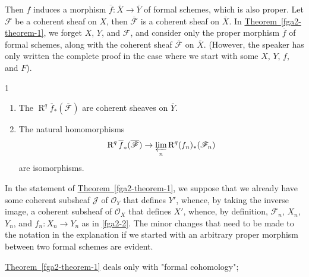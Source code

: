   Then \(f\) induces a morphism \(\overline {f}\colon \overline {X}\to \overline {Y}\) of formal schemes, which is also proper.
  Let \(\mathscr {F}\) be a coherent sheaf on \(X\), then \(\overline {\mathscr {F}}\) is a coherent sheaf on \(\overline {X}\).
  In \hyperref[fga2-theorem-1]{Theorem~\ref*{fga2-theorem-1}}, we forget \(X\), \(Y\), and \(\mathscr {F}\), and consider only the proper morphism \(\overline {f}\) of formal schemes, along with the coherent sheaf \(\overline {\mathscr {F}}\) on \(\overline {X}\).
  (However, the speaker has only written the complete proof in the case where we start with some \(X\), \(Y\), \(f\), and \(F\)).\begin{theorem}{1}\label{fga2-theorem-1}\skipsinglepar\begin{enumerate}
    
 \item[i.]
      The \(\operatorname {R}^q\overline {f}_*(\overline {\mathscr {F}})\) are coherent sheaves on \(\overline {Y}\).
    


    
 \item[ii.]
      The natural homomorphisms
      \[         \operatorname {R}^q\overline {f}_*(\overline {\mathscr {F}})         \to  \varprojlim _n\operatorname {R}^q (f_n)_*(\mathscr {F}_n)       \]
      are isomorphisms.
    

  \end{enumerate}\end{theorem}\par{}In the statement of \hyperref[fga2-theorem-1]{Theorem~\ref*{fga2-theorem-1}}, we suppose that we already have some coherent subsheaf \(\mathscr {J}\) of \(\mathcal {O}_Y\) that defines \(Y'\), whence, by taking the inverse image, a coherent subsheaf of \(\mathcal {O}_X\) that defines \(X'\), whence, by definition, \(\mathscr {F}_n\), \(X_n\), \(Y_n\), and \(f_n\colon  X_n\to  Y_n\) as in \cref{fga2-2}.
  The minor changes that need to be made to the notation in the explanation if we started with an arbitrary proper morphism between two formal schemes are evident.\par{}\hyperref[fga2-theorem-1]{Theorem~\ref*{fga2-theorem-1}} deals only with "formal cohomology";
